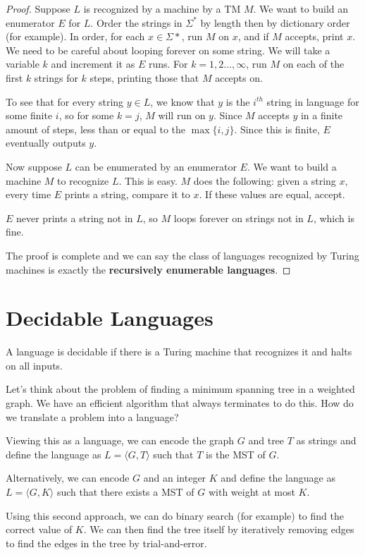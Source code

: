 \begin{proof}
	
	Suppose $L$ is recognized by a machine by a TM $M$.  We want to build an enumerator $E$ for $L$.  Order the strings in $\Sigma^*$ by length then by dictionary order (for example).  In order, for each $x\in\Sigma*$, run $M$ on $x$, and if $M$ accepts, print $x$.  We need to be careful about looping forever on some string.  We will take a variable $k$ and increment it as $E$ runs.  For $k=1,2\dots,\infty$, run $M$ on each of the first $k$ strings for $k$ steps, printing those that $M$ accepts on.
	
	To see that for every string $y\in L$, we know that $y$ is the $i^{th}$ string in language for some finite $i$, so for some $k = j$, $M$ will run on $y$.  Since $M$ accepts $y$ in a finite amount of steps, less than or equal to the $\max\{i,j\}$.  Since this is finite, $E$ eventually outputs $y$.
	
	Now suppose $L$ can be enumerated by an enumerator $E$.  We want to build a machine $M$ to recognize $L$.  This is easy.  $M$ does the following: given a string $x$, every time $E$ prints a string, compare it to $x$.  If these values are equal, accept.  
	
	$E$ never prints a string not in $L$, so $M$ loops forever on strings not in $L$, which is fine.
	
	The proof is complete and we can say the class of languages recognized by Turing machines is exactly the \textbf{recursively enumerable languages}.
	
	
\end{proof}


\section{Decidable Languages}

A language is decidable if there is a Turing machine that recognizes it and halts on all inputs.

Let's think about the problem of finding a minimum spanning tree in a weighted graph.  We have an efficient algorithm that always terminates to do this.  How do we translate a problem into a language?

Viewing this as a language, we can encode the graph $G$ and tree $T$ as strings and define the language as $L=\langle G,T\rangle$ such that $T$ is the MST of $G$.  

Alternatively, we can encode $G$ and an integer $K$ and define the language as $L = \langle G,K\rangle$ such that there exists a MST of $G$ with weight at most $K$.

Using this second approach, we can do binary search (for example) to find the correct value of $K$.  We can then find the tree itself by iteratively removing edges to find the edges in the tree by trial-and-error.













